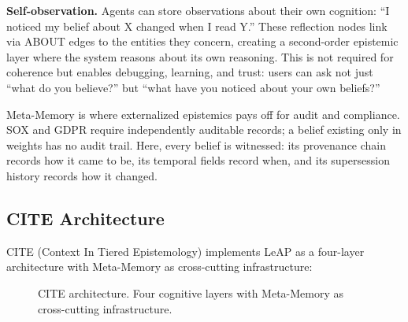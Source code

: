 \documentclass[11pt,letterpaper]{article}
\begin{document}
\textbf{Self-observation.} Agents can store observations about their own cognition: ``I noticed my belief about X changed when I read Y.'' These reflection nodes link via ABOUT edges to the entities they concern, creating a second-order epistemic layer where the system reasons about its own reasoning. This is not required for coherence but enables debugging, learning, and trust: users can ask not just ``what do you believe?'' but ``what have you noticed about your own beliefs?''

Meta-Memory is where externalized epistemics pays off for audit and compliance. SOX and GDPR require independently auditable records; a belief existing only in weights has no audit trail. Here, every belief is witnessed: its provenance chain records how it came to be, its temporal fields record when, and its supersession history records how it changed.

\subsection{CITE Architecture}

CITE (Context In Tiered Epistemology) implements LeAP as a four-layer architecture with Meta-Memory as cross-cutting infrastructure:

\begin{figure}[H]
\centering
{}
\caption{CITE architecture. Four cognitive layers with Meta-Memory as cross-cutting infrastructure.}
\label{fig:layers}
\end{figure}
\end{document}
